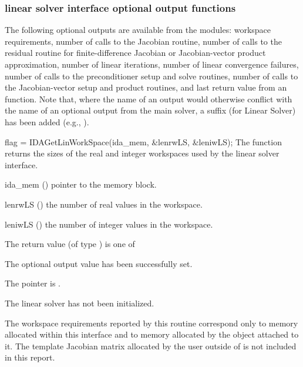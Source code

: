 {%
\subsubsection{{\idals} linear solver interface optional output functions}
\label{sss:optout_ls}
The following optional outputs are available from the {\idals} modules:
workspace requirements,
number of calls to the Jacobian routine,
number of calls to the residual routine for finite-difference Jacobian
or Jacobian-vector product approximation,
number of linear iterations,
number of linear convergence failures,
number of calls to the preconditioner setup and solve routines,
number of calls to the Jacobian-vector setup and product routines,
and last return value from an {\idals} function.
Note that, where the name of an output would otherwise conflict with
the name of an optional output from the main solver, a suffix 
(for Linear Solver) has been added (e.g., ).

{
  flag = IDAGetLinWorkSpace(ida\_mem, \&lenrwLS, \&leniwLS);
}
{
  The function  returns the sizes of the real and
  integer workspaces used by the {\idals} linear solver interface.
}
{
  \begin{args}
  \item[ida\_mem] ()
    pointer to the {\idas} memory block.
  \item[lenrwLS] ()
    the number of real values in the {\idals} workspace.
  \item[leniwLS] ()
    the number of integer values in the {\idals} workspace.
  \end{args}
}
{
  The return value  (of type ) is one of
  \begin{args}
  \item[\Id{IDALS\_SUCCESS}]
    The optional output value has been successfully set.
  \item[\Id{IDALS\_MEM\_NULL}]
    The  pointer is .
  \item[\Id{IDALS\_LMEM\_NULL}]
    The {\idals} linear solver has not been initialized.
  \end{args}
}
{
  The workspace requirements reported by this routine correspond only
  to memory allocated within this interface and to memory allocated by
  the {\sunlinsol} object attached to it.  The template Jacobian
  matrix allocated by the user outside of {\idals} is not included in
  this report.
  
}}
